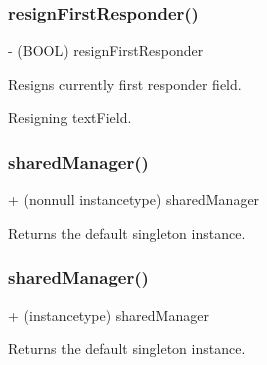 \subsubsection{\texorpdfstring{resign\+First\+Responder()}{resignFirstResponder()}\hspace{0.1cm}{\footnotesize\ttfamily [3/3]}}
{\footnotesize\ttfamily -\/ (B\+O\+OL) resign\+First\+Responder \begin{DoxyParamCaption}{ }\end{DoxyParamCaption}}

Resigns currently first responder field.

Resigning text\+Field. \mbox{\label{interface_i_q_keyboard_manager_a34a9bbb02225b2508e06e6793138d99c}} 
\subsubsection{\texorpdfstring{shared\+Manager()}{sharedManager()}\hspace{0.1cm}{\footnotesize\ttfamily [1/3]}}
{\footnotesize\ttfamily + (nonnull instancetype) shared\+Manager \begin{DoxyParamCaption}{ }\end{DoxyParamCaption}}

Returns the default singleton instance. \mbox{\label{interface_i_q_keyboard_manager_a159842a915f7df414b3e98ee829da9ca}} 
\subsubsection{\texorpdfstring{shared\+Manager()}{sharedManager()}\hspace{0.1cm}{\footnotesize\ttfamily [2/3]}}
{\footnotesize\ttfamily + (instancetype) shared\+Manager \begin{DoxyParamCaption}{ }\end{DoxyParamCaption}}

Returns the default singleton instance. \mbox{\label{interface_i_q_keyboard_manager_a34a9bbb02225b2508e06e6793138d99c}} 
